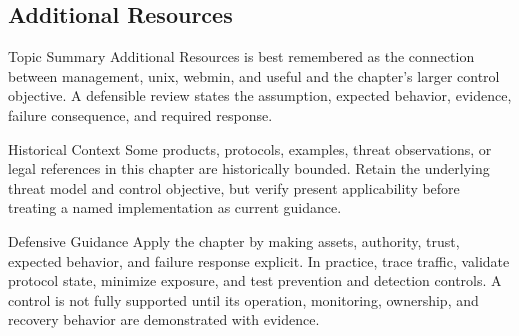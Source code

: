 \documentclass[11pt,letterpaper]{article}
\begin{document}
\subsection*{Additional Resources}
\begin{CornellNotesTable}
\end{CornellNotesTable}
\begin{CornellSummaryBox}{Topic Summary}
Additional Resources is best remembered as the connection between management, unix, webmin, and useful and the chapter's larger control objective. A defensible review states the assumption, expected behavior, evidence, failure consequence, and required response.
\end{CornellSummaryBox}
\begin{CornellWarningBox}{Historical Context}
Some products, protocols, examples, threat observations, or legal references in this chapter are historically bounded. Retain the underlying threat model and control objective, but verify present applicability before treating a named implementation as current guidance.
\end{CornellWarningBox}
\begin{CornellOverviewBox}{Defensive Guidance}
Apply the chapter by making assets, authority, trust, expected behavior, and failure response explicit. In practice, trace traffic, validate protocol state, minimize exposure, and test prevention and detection controls. A control is not fully supported until its operation, monitoring, ownership, and recovery behavior are demonstrated with evidence.
\end{CornellOverviewBox}
\end{document}
